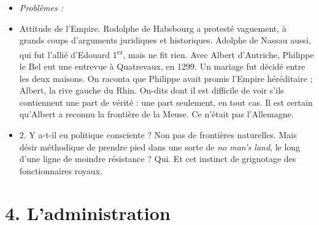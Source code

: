 \documentclass[french,twoside]{book} %
\newlength{\listmod}
\newcommand{\listhead}[1]{\hspace{-1\listmod}\emph{#1}}
\newcommand\chapteropen{} %
\newcommand\chaptercont{} %
\newcommand\chapterclose{} %
\begin{document}
\begin{enumerate}[itemsep=\baselineskip,]
\begin{itemize}[itemsep=0pt,]
\item[]\listhead{Problèmes :}
\item Attitude de l’Empire. Rodolphe de Habsbourg a protesté vaguement, à grands coups d’arguments juridiques et historiques. Adolphe de Nassau aussi, qui fut l’allié d’Edouard 1\textsuperscript{er}, mais ne fit rien. Avec Albert d’Autriche, Philippe le Bel eut une entrevue à Quatrevaux, en 1299. Un mariage fut décidé entre les deux maisons. On raconta que Philippe avait promis l’Empire héréditaire ; Albert, la rive gauche du Rhin. On-dits dont il est difficile de voir s’ils contiennent une part de vérité : une part seulement, en tout cas. Il est certain qu’Albert a reconnu la frontière de la Meuse. Ce n’était pas l’Allemagne.
\item 2. Y a-t-il eu politique consciente ? Non pas de frontières naturelles. Mais désir méthodique de prendre pied dans une sorte de {\itshape no man’s land}, le long d’une ligne de moindre résistance ? Qui. Et cet instinct de grignotage des fonctionnaires royaux.
\end{itemize}


\end{enumerate}\chapterclose


\chapteropen
\chapter[4. L’administration]{\textsc{4. }L’administration}
\label{c04}

\chaptercont
\end{document}
